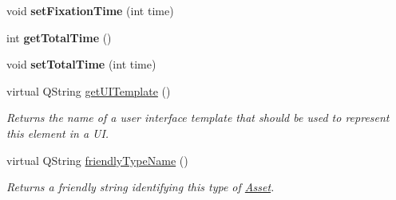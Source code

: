 \begin{DoxyCompactItemize}
\item 
\hypertarget{class_picto_1_1_choice_controller_a21b6138513e314ab6186249b6d05b434}{void {\bfseries set\-Fixation\-Time} (int time)}\label{class_picto_1_1_choice_controller_a21b6138513e314ab6186249b6d05b434}

\item 
\hypertarget{class_picto_1_1_choice_controller_a41bc4b8dd5ffd925a80d6e7f77f9832b}{int {\bfseries get\-Total\-Time} ()}\label{class_picto_1_1_choice_controller_a41bc4b8dd5ffd925a80d6e7f77f9832b}

\item 
\hypertarget{class_picto_1_1_choice_controller_a84597979e0d9899c4f5b4f6bd6965d88}{void {\bfseries set\-Total\-Time} (int time)}\label{class_picto_1_1_choice_controller_a84597979e0d9899c4f5b4f6bd6965d88}

\item 
\hypertarget{class_picto_1_1_choice_controller_a1578256a998c5d533f0907f509685d89}{virtual Q\-String \hyperlink{class_picto_1_1_choice_controller_a1578256a998c5d533f0907f509685d89}{get\-U\-I\-Template} ()}\label{class_picto_1_1_choice_controller_a1578256a998c5d533f0907f509685d89}

\begin{DoxyCompactList}\small\item\em Returns the name of a user interface template that should be used to represent this element in a U\-I. \end{DoxyCompactList}\item 
virtual Q\-String \hyperlink{class_picto_1_1_choice_controller_ac0ba6f4a836f383ddda56b484bd96c22}{friendly\-Type\-Name} ()
\begin{DoxyCompactList}\small\item\em Returns a friendly string identifying this type of \hyperlink{class_picto_1_1_asset}{Asset}. \end{DoxyCompactList}\end{DoxyCompactItemize}
